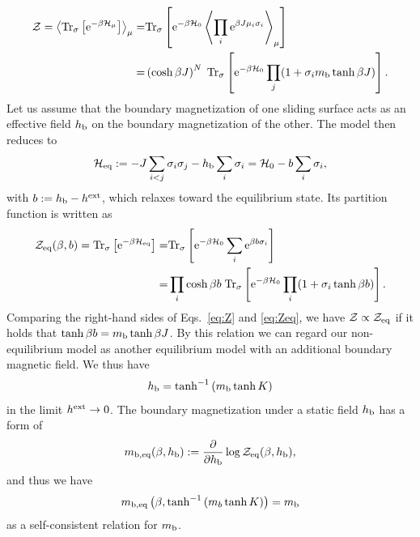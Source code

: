 \begin{align}
\mathcal{Z} = \left\langle\mathrm{Tr}_{\sigma}\left[\mathrm{e}^{-\beta \mathcal{H}_{\mu}}\right]\right\rangle_{\mu} =&\mathrm{Tr}_{\sigma}\left[\mathrm{e}^{-\beta \mathcal{H}_{0}}\left\langle\prod_{i}\mathrm{e}^{\beta J\mu_{i}\sigma_{i}}\right\rangle_{\mu}\right]\\
=&\left(\cosh \beta J\right)^{N}\;\mathrm{Tr}_{\sigma}\left[\mathrm{e}^{-\beta \mathcal{H}_{0}}\prod_{j}(1+\sigma_{i}m_{\rm b}\tanh \beta J)\right].\label{eq:Z}
\end{align}
Let us assume that the boundary magnetization of one sliding surface acts as an effective field $h_{\rm b}$ on the boundary magnetization of the other.  The model then reduces to
\begin{align}
\mathcal{H}_{\rm eq}:=-J\sum_{i<j}\sigma_{i}\sigma_{j}-h_{\rm b}\sum_{i}\sigma_{i}=\mathcal{H}_{0} - b\sum_{i}\sigma_{i},
\end{align}
with $b:=h_{\rm b}-h^{\rm ext}$, which relaxes toward the equilibrium state. Its partition function is written as
\begin{align}
\mathcal{Z}_{\rm eq}(\beta,b)=\mathrm{Tr}_{\sigma}\left[\mathrm{e}^{-\beta\mathcal{H}_{\rm eq}}\right]=&\mathrm{Tr}_{\sigma}\left[\mathrm{e}^{-\beta \mathcal{H}_{0}}\sum_{i}\mathrm{e}^{\beta b\sigma_{i}}\right]\\
=&\prod_{i}\cosh \beta b\;\mathrm{Tr}_{\sigma}\left[\mathrm{e}^{-\beta\mathcal{H}_{0}}\prod_{i}(1+\sigma_{i}\tanh \beta b)\right].\label{eq:Zeq}
\end{align}
Comparing the right-hand sides of Eqs.~\eqref{eq:Z} and \eqref{eq:Zeq}, we have $\mathcal{Z} \propto\mathcal{Z}_{\rm eq}$ if it holds that $\tanh\beta b=m_{\rm b}\tanh \beta J$. By this relation we can regard our non-equilibrium model as another equilibrium model with an additional boundary magnetic field. We thus have
\begin{align}
h_{\rm b}=\tanh^{-1}\left(m_{\rm b}\tanh K\right)
\end{align}
in the limit $h^{\rm ext}\to 0$.
The boundary magnetization under a static field $h_{\rm b}$ has a form of
\begin{align}
m_{\rm b, eq}(\beta,h_{\rm b}):=\frac{\partial}{\partial h_{\rm b}}\log\mathcal{Z}_{\rm eq}(\beta,h_{\rm b}),
\end{align}
and thus we have
\begin{align}
m_{\rm b, eq}\left(\beta,\tanh^{-1}\left(m_{b}\tanh K\right)\right)=m_{\rm b}\label{cond:critcond1}
\end{align}
as a self-consistent relation for $m_{\rm b}$. 

